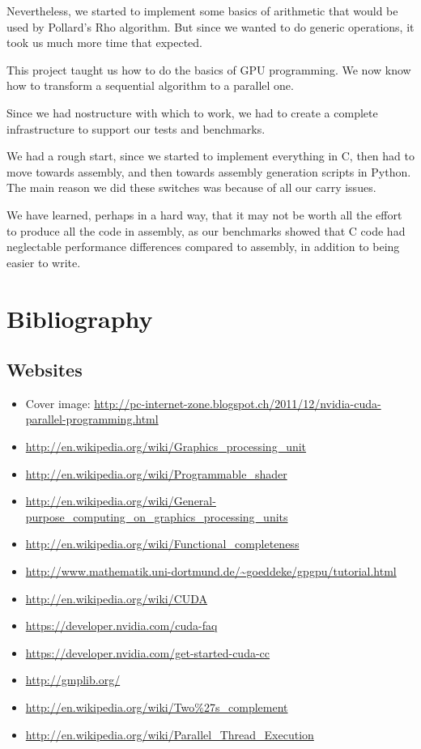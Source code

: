 \documentclass[12pt, a4paper]{report}
\begin{document}
Nevertheless, we started to implement some basics of arithmetic that would be used
by Pollard's Rho algorithm.
But since we wanted to do generic operations, it took us much more time that expected.

This project taught us how to do the basics of GPU programming. We now know how to
transform a sequential algorithm to a parallel one.

Since we had nostructure with which to work, we had to create a complete infrastructure to
support our tests and benchmarks.

We had a rough start, since we started to implement everything in C, then had to move towards
assembly, and then towards assembly generation scripts in Python.
The main reason we did these switches was because of all our carry issues.

We have learned, perhaps in a hard way, that it may not be worth all the effort to
produce all the code in assembly, as our benchmarks showed that C code had neglectable
performance differences compared to assembly, in addition to being easier to write.

\chapter{Bibliography}
\section{Websites}
\begin{itemize}
\item Cover image: \url{http://pc-internet-zone.blogspot.ch/2011/12/nvidia-cuda-parallel-programming.html}
\item \url{http://en.wikipedia.org/wiki/Graphics_processing_unit}
\item \url{http://en.wikipedia.org/wiki/Programmable_shader}
\item \url{http://en.wikipedia.org/wiki/General-purpose_computing_on_graphics_processing_units}
\item \url{http://en.wikipedia.org/wiki/Functional_completeness}
\item \url{http://www.mathematik.uni-dortmund.de/~goeddeke/gpgpu/tutorial.html}
\item \url{http://en.wikipedia.org/wiki/CUDA}
\item \url{https://developer.nvidia.com/cuda-faq}
\item \url{https://developer.nvidia.com/get-started-cuda-cc}
\item \url{http://gmplib.org/}
\item \url{http://en.wikipedia.org/wiki/Two%27s_complement}
\item \url{http://en.wikipedia.org/wiki/Parallel_Thread_Execution}
\end{itemize}
\end{document}
